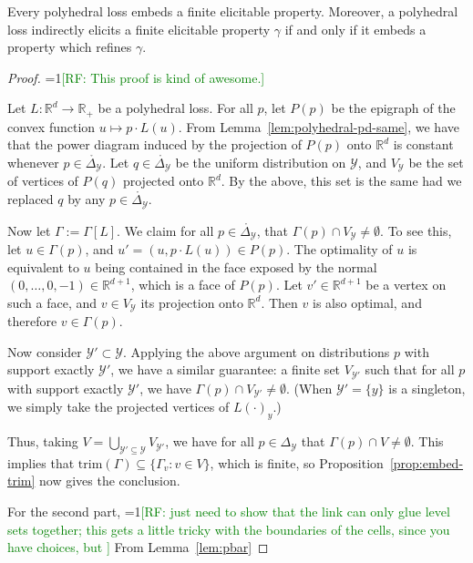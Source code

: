 \documentclass[anon,12pt]{colt2019}
\newcommand{\Comments}{1}
\newcommand{\mynote}[2]{\ifnum\Comments=1\textcolor{#1}{#2}\fi}
\newcommand{\raf}[1]{\mynote{green}{[RF: #1]}}
\newcommand{\reals}{\mathbb{R}}
\newcommand{\simplex}{\Delta_\Y}
\newcommand{\Y}{\mathcal{Y}}
\newcommand{\inter}[1]{\mathring{#1}}%
\newcommand{\trim}{\mathrm{trim}}
\begin{document}
\begin{theorem}\label{thm:polyhedral-embed}
  Every polyhedral loss embeds a finite elicitable property.
  Moreover, a polyhedral loss indirectly elicits a finite elicitable property $\gamma$ if and only if it embeds a property which refines $\gamma$.
\end{theorem}
\begin{proof}
  \raf{This proof is kind of awesome.}

  Let $L:\reals^d\to\reals_+$ be a polyhedral loss.
  For all $p$, let $P(p)$ be the epigraph of the convex function $u\mapsto p\cdot L(u)$.
  From Lemma~\ref{lem:polyhedral-pd-same}, we have that the power diagram induced by the projection of $P(p)$ onto $\reals^d$ is constant whenever $p\in\inter\simplex$.
  Let $q\in\inter\simplex$ be the uniform distribution on $\Y$, and $V_\Y$ be the set of vertices of $P(q)$ projected onto $\reals^d$.
  By the above, this set is the same had we replaced $q$ by any $p\in\inter\simplex$.

  Now let $\Gamma := \Gamma[L]$.
  We claim for all $p\in\inter\simplex$, that $\Gamma(p) \cap V_\Y \neq \emptyset$.
  To see this, let $u \in \Gamma(p)$, and $u' = (u,p\cdot L(u)) \in P(p)$.
  The optimality of $u$ is equivalent to $u$ being contained in the face exposed by the normal $(0,\ldots,0,-1)\in\reals^{d+1}$, which is a face of $P(p)$.
  Let $v'\in\reals^{d+1}$ be a vertex on such a face, and $v\in V_\Y$ its projection onto $\reals^d$.
  Then $v$ is also optimal, and therefore $v\in\Gamma(p)$.

  Now consider $\Y'\subset \Y$.
  Applying the above argument on distributions $p$ with support exactly $\Y'$, we have a similar guarantee: a finite set $V_{\Y'}$ such that for all $p$ with support exactly $\Y'$, we have $\Gamma(p) \cap V_{\Y'} \neq \emptyset$.
  (When $\Y' = \{y\}$ is a singleton, we simply take the projected vertices of $L(\cdot)_y$.)

  Thus, taking $V = \bigcup_{\Y'\subseteq\Y} V_{\Y'}$, we have for all $p\in\simplex$ that $\Gamma(p) \cap V \neq \emptyset$.
  This implies that $\trim(\Gamma) \subseteq \{\Gamma_v : v\in V\}$, which is finite, so Proposition~\ref{prop:embed-trim} now gives the conclusion.

  For the second part, \raf{just need to show that the link can only glue level sets together; this gets a little tricky with the boundaries of the cells, since you have choices, but }
  From Lemma~\ref{lem:pbar}
\end{proof}
\end{document}
